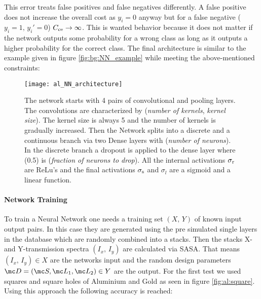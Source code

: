 \noindent
This error treats false positives and false negatives differently. A false positive does not increase the overall cost as $y_i = 0$ anyway but for a false negative ($y_i = 1, \, y_i' = 0$) $C_{\mathrm{ce}} \rightarrow \infty$. This is wanted behavior because it does not matter if the network outputs some probability for a wrong class as long as it outputs a higher probability for the correct class. The final architecture is similar to the example given in figure \ref{fig:bg:NN_example} while meeting the above-mentioned constraints:

\begin{figure}[H]
    \centering
    \texttt{[image: al\_NN\_architecture]}
    \caption{The network starts with 4 pairs of convolutional and pooling layers. The convolutions are characterized by (\textit{number of kernels}, \textit{kernel size}). The kernel size is always 5 and the number of kernels is gradually increased. Then the Network splits into a discrete and a continuous branch via two Dense layers with (\textit{number of neurons}). In the discrete branch a dropout is applied to the dense layer where (0.5) is (\textit{fraction of neurons to drop}).
    All the internal activations $\sigma_{\mathrm{r}}$ are ReLu's and the final activations $\sigma_{\mathrm{s}}$ and $\sigma_{l}$ are a sigmoid and a linear function.}
    \label{fig:al:NN_architecture}
\end{figure}

\newpage
\paragraph{Network Training}
To train a Neural Network one needs a training set $(X, \, Y)$ of known input output pairs. In this case they are generated using the pre simulated single layers in the database which are randomly combined into a stacks. Then the stacks X- and Y-transmission spectra $(I_x, \, I_y)$ are calculated via SASA.
That means $(I_x, \, I_y) \in X$ are the networks input and the random design parameters ${\mc D = (\mc S, \mc L_1, \mc L_2) \in Y}$ are the output. For the first test we used squares and square holes of Aluminium and Gold as seen in figure \ref{fig:al:square}. Using this approach the following accuracy is reached:

